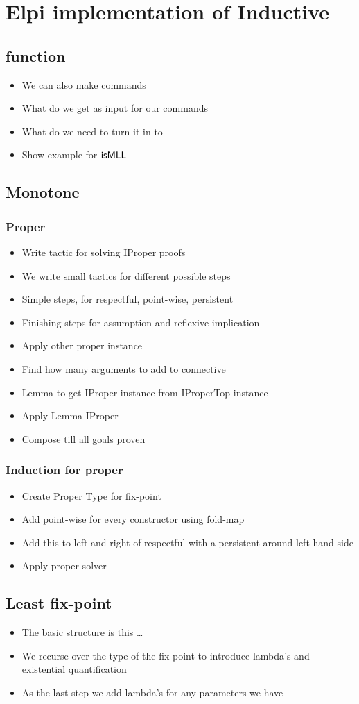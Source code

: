 \documentclass[thesis.tex]{subfiles}
\begin{document}
\chapter{Elpi implementation of Inductive}\label{ch:inductiveimpl}
\section{function}

\begin{itemize}
  \item We can also make commands
  \item What do we get as input for our commands
  \item What do we need to turn it in to
  \item Show example for $\textsf{\upshape isMLL}$
\end{itemize}

\section{Monotone}
\subsection{Proper}
\begin{itemize}
  \item Write tactic for solving IProper proofs
  \item We write small tactics for different possible steps
  \item Simple steps, for respectful, point-wise, persistent
  \item Finishing steps for assumption and reflexive implication
  \item Apply other proper instance
  \item Find how many arguments to add to connective
  \item Lemma to get IProper instance from IProperTop instance
  \item Apply Lemma IProper
  \item Compose till all goals proven
\end{itemize}

\subsection{Induction for proper}
\begin{itemize}
  \item Create Proper Type for fix-point
  \item Add point-wise for every constructor using fold-map
  \item Add this to left and right of respectful with a persistent around left-hand side
  \item Apply proper solver
\end{itemize}

\section{Least fix-point}
\begin{itemize}
  \item The basic structure is this \dots
  \item We recurse over the type of the fix-point to introduce lambda's and existential quantification
  \item As the last step we add lambda's for any parameters we have
\end{itemize}
\end{document}
